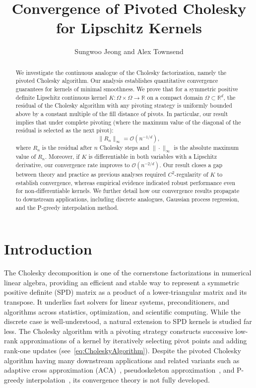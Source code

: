 \documentclass{amsart}
\title{Convergence of Pivoted Cholesky for Lipschitz Kernels}
\author{Sungwoo Jeong and Alex Townsend}
\date{}
\theoremstyle{definition}
\theoremstyle{remark}
\begin{document}
\begin{abstract}
    We investigate the continuous analogue of the Cholesky factorization, namely the pivoted Cholesky algorithm. Our analysis establishes quantitative convergence guarantees for kernels of minimal smoothness. We prove that for a symmetric positive definite Lipschitz continuous kernel $K:\Omega\times \Omega \rightarrow \mathbb{R}$ on a compact domain $\Omega\subset\mathbb{R}^d$, the residual of the Cholesky algorithm with any pivoting strategy is uniformly bounded above by a constant multiple of the fill distance of pivots. In particular, our result implies that under complete pivoting (where the maximum value of the diagonal of the residual is selected as the next pivot):
    \begin{equation*}
        \|R_n\|_{\infty} = \mathcal{O}(n^{-1/d}),
    \end{equation*}
    where $R_n$ is the residual after $n$ Cholesky steps and $\|\cdot\|_\infty$ is the absolute maximum value of $R_n$. Moreover, if $K$ is differentiable in both variables with a Lipschitz derivative, our convergence rate improves to $\mathcal{O}(n^{-2/d})$. Our result closes a gap between theory and practice as previous analyses required $C^2$-regularity of $K$ to establish convergence, whereas empirical evidence indicated robust performance even for non-differentiable kernels. We further detail how our convergence results propagate to downstream applications, including discrete analogues, Gaussian process regression, and the P-greedy interpolation method.
\end{abstract}

\maketitle

\section{Introduction}
The Cholesky decomposition is one of the cornerstone factorizations in numerical linear algebra, providing an efficient and stable way to represent a symmetric positive definite (SPD) matrix as a product of a lower-triangular matrix and its transpose. It underlies fast solvers for linear systems, preconditioners, and algorithms across statistics, optimization, and scientific computing. While the discrete case is well-understood, a natural extension to SPD kernels is studied far less. The Cholesky algorithm with a pivoting strategy constructs successive low-rank approximations of a kernel by iteratively selecting pivot points and adding rank-one updates (see~\cref{eq:CholeskyAlgorithm}). Despite the pivoted Cholesky algorithm having many downstream applications and related variants such as adaptive cross approximation (ACA)~\cite{bebendorf2000approximation}, pseudoskeleton approximation~\cite{goreinov1997theory}, and P-greedy interpolation~\cite{de2005near}, its convergence theory is not fully developed.
\end{document}
